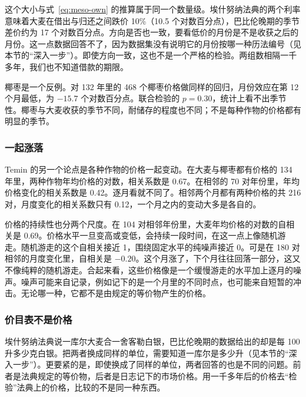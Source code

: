 这个大小与式~\eqref{eq:meso-own} 的推算属于同一个数量级。埃什努纳法典的两个利率意味着大麦在借出与归还之间跌价 10\%（10.5 个对数百分点），巴比伦晚期的季节差价约为 17 个对数百分点。方向是否也一致，要看低价的月份是不是收获之后的月份。这一点数据回答不了，因为数据集没有说明它的月份按哪一种历法编号（见本节的“深入一步”）。即使方向一致，这也不是一个严格的检验。两组数相隔一千多年，我们也不知道借款的期限。

椰枣是一个反例。对 132 年里的 468 个椰枣价格做同样的回归，月份效应在第 12 个月最低，为 $-15.7$ 个对数百分点。联合检验的 $p=0.30$，统计上看不出季节性。椰枣与大麦收获的季节不同，耐储存的程度也不同；不是每种作物的价格都有明显的季节。

\subsubsection{一起涨落}
Temin 的另一个论点是各种作物的价格一起变动。在大麦与椰枣都有价格的 134 年里，两种作物年均价格的对数，相关系数是 0.67。在相邻的 70 对年份里，年均价格变化的相关系数是 0.42。逐月看就不同了。相邻两个月都有两种价格的共 216 对，月度变化的相关系数只有 0.12，一个月之内的变动大多是各自的。

价格的持续性也分两个尺度。在 104 对相邻年份里，大麦年均价格的对数的自相关是 0.69。价格水平一旦变高或变低，会持续一段时间，在这一点上像随机游走。随机游走的这个自相关接近 1，围绕固定水平的纯噪声接近 0。可是在 180 对相邻的月度变化里，自相关是 $-0.20$。这个月涨了，下个月往往回落一部分，这又不像纯粹的随机游走。合起来看，这些价格像是一个缓慢游走的水平加上逐月的噪声。噪声可能来自记录，例如记下的是一个月里的不同时点，也可能来自短暂的冲击。无论哪一种，它都不是由规定的等价物产生的价格。

\subsubsection{价目表不是价格}
埃什努纳法典说一库尔大麦合一舍客勒白银，巴比伦晚期的数据给出的却是每 100 升多少克白银。把两者换成同样的单位，需要知道一库尔是多少升（见本节的“深入一步”）。更要紧的是，即使换成了同样的单位，两者回答的也是不同的问题。前者是法典规定的等价物，后者是日志记下的市场价格。用一千多年后的价格去“检验”法典上的价格，比较的不是同一种东西。

